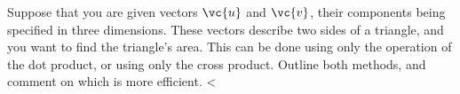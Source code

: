 Suppose that you are given vectors $\vc{u}$ and $\vc{v}$, their components
being specified in three dimensions. These vectors describe two sides of
a triangle, and you want to find the triangle's area. This can be done using
only the operation of the dot product, or using only the cross product.
Outline both methods, and comment on which is more efficient.
<%
